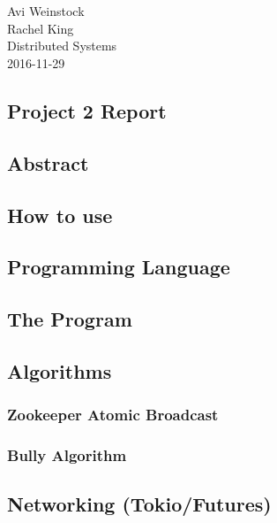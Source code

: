\documentclass{article}
\begin{document}
\section*{}
Avi Weinstock \\
Rachel King \\
Distributed Systems\\
2016-11-29

\begin{center}
	\section*{Project 2 Report}
\end{center}

\subsection*{Abstract}

\subsection*{How to use}

\subsection*{Programming Language}

\subsection*{The Program}
 
\subsection*{Algorithms}
\subsubsection*{Zookeeper Atomic Broadcast}
\subsubsection*{Bully Algorithm}

\subsection*{Networking (Tokio/Futures)}
\end{document}
